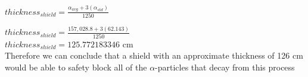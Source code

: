 \documentclass[12pt, letterpaper, twoside]{article}
\begin{document}
\hspace{4.8cm}$thickness_{shield} = \frac{\alpha_{avg}  +  3(\alpha_{std})}{1250}$

\hspace{4.8cm}$thickness_{shield} = \frac{157,028.8  +  3(62.143)}{1250}$ \\


\hspace{4.8cm}$thickness_{shield} = 125.772183346$ cm\\


Therefore we can conclude that a shield with an approximate thickness of 126 cm would be able to safety block all of the $\alpha$-particles that decay from this process
\end{document}
